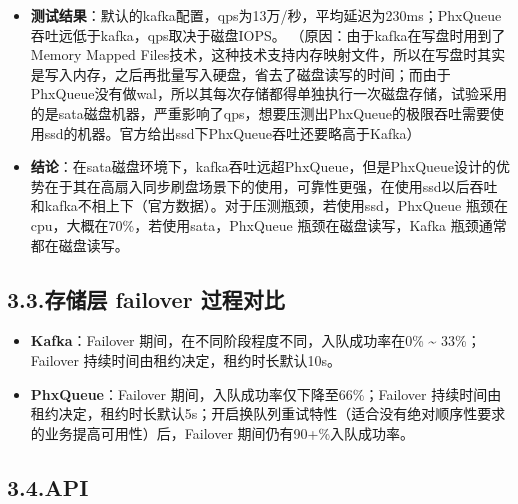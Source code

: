 \documentclass{article}
\begin{document}
\begin{itemize}%

\item{}
\textbf{测试结果}：默认的kafka配置，qps为13万/秒，平均延迟为230ms；PhxQueue吞吐远低于kafka，qps取决于磁盘IOPS。\mdbr
{}（原因：由于kafka在写盘时用到了Memory Mapped Files技术，这种技术支持内存映射文件，所以在写盘时其实是写入内存，之后再批量写入硬盘，省去了磁盘读写的时间；而由于PhxQueue没有做wal，所以其每次存储都得单独执行一次磁盘存储，试验采用的是sata磁盘机器，严重影响了qps，想要压测出PhxQueue的极限吞吐需要使用ssd的机器。官方给出ssd下PhxQueue吞吐还要略高于Kafka）%

\item{}
\textbf{结论}：在sata磁盘环境下，kafka吞吐远超PhxQueue，但是PhxQueue设计的优势在于其在高扇入同步刷盘场景下的使用，可靠性更强，在使用ssd以后吞吐和kafka不相上下（官方数据）。对于压测瓶颈，若使用ssd，PhxQueue 瓶颈在 cpu，大概在70\%，若使用sata，PhxQueue 瓶颈在磁盘读写，Kafka 瓶颈通常都在磁盘读写。%
\end{itemize}%

\subsection{3.3.\hspace*{0.5em}存储层 failover 过程对比}\label{sec--failover-}%

\begin{itemize}[noitemsep,topsep=\mdcompacttopsep]%

\item{}\textbf{Kafka}：Failover 期间，在不同阶段程度不同，入队成功率在0\% \textasciitilde{} 33\%；Failover 持续时间由租约决定，租约时长默认10s。%

\item{}\textbf{PhxQueue}：Failover 期间，入队成功率仅下降至66\%；Failover 持续时间由租约决定，租约时长默认5s；开启换队列重试特性（适合没有绝对顺序性要求的业务提高可用性）后，Failover 期间仍有90+\%入队成功率。%
\end{itemize}%

\subsection{3.4.\hspace*{0.5em}API}\label{sec-api}%
\end{document}
